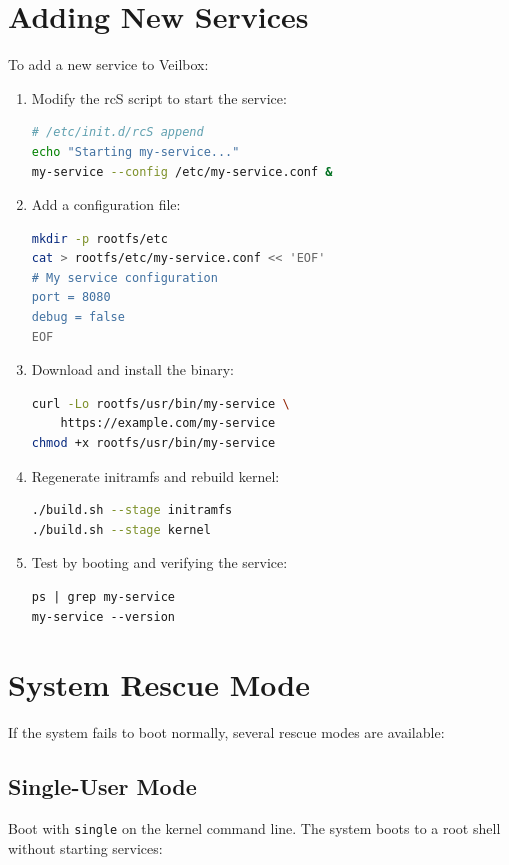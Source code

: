 \section{Adding New Services}

To add a new service to Veilbox:

\begin{enumerate}[nosep]
  \item Modify the rcS script to start the service:
\begin{lstlisting}[language=bash]
# /etc/init.d/rcS append
echo "Starting my-service..."
my-service --config /etc/my-service.conf &
\end{lstlisting}
  \item Add a configuration file:
\begin{lstlisting}[language=bash]
mkdir -p rootfs/etc
cat > rootfs/etc/my-service.conf << 'EOF'
# My service configuration
port = 8080
debug = false
EOF
\end{lstlisting}
  \item Download and install the binary:
\begin{lstlisting}[language=bash]
curl -Lo rootfs/usr/bin/my-service \
    https://example.com/my-service
chmod +x rootfs/usr/bin/my-service
\end{lstlisting}
  \item Regenerate initramfs and rebuild kernel:
\begin{lstlisting}[language=bash]
./build.sh --stage initramfs
./build.sh --stage kernel
\end{lstlisting}
  \item Test by booting and verifying the service:
\begin{lstlisting}
ps | grep my-service
my-service --version
\end{lstlisting}
\end{enumerate}

\section{System Rescue Mode}

If the system fails to boot normally, several rescue modes are available:

\subsection{Single-User Mode}

Boot with \texttt{single} on the kernel command line. The system boots
to a root shell without starting services:

